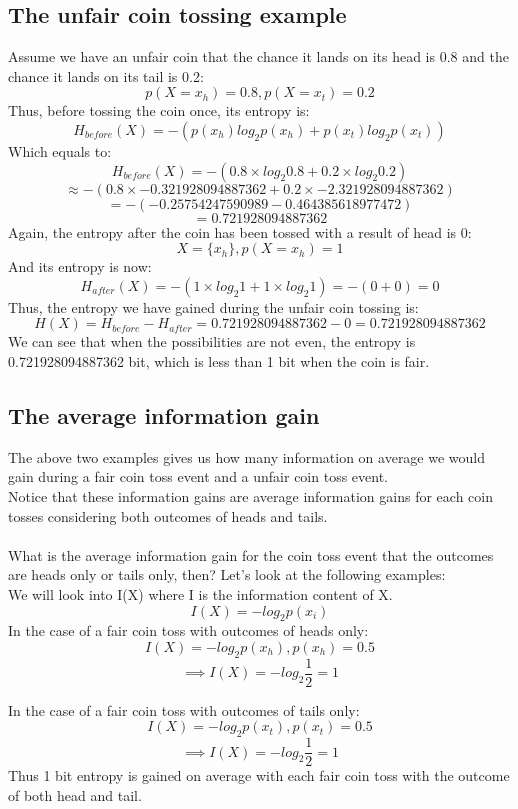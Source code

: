 \documentclass[12pt]{article}
\begin{document}
\subsection{The unfair coin tossing example}
Assume we have an unfair coin that the chance it lands on its head is 0.8 and the chance it lands on its tail is 0.2:
\[
	p(X=x_h) = 0.8, p(X=x_t) = 0.2
\]
Thus, before tossing the coin once, its entropy is:
\[
	H_{before}(X) = -(p(x_h)log_{2}p(x_h) + p(x_t)log_{2}p(x_t))
\]
Which equals to:
\[
	H_{before}(X) = -(0.8 \times log_{2} 0.8 + 0.2 \times log_{2} 0.2)
\]
\[
		\approx -(0.8 \times -0.321928094887362 + 0.2 \times -2.321928094887362)
\]
\[
		= -(-0.25754247590989-0.464385618977472)
\]
\[
		= 0.721928094887362
\]
Again, the entropy after the coin has been tossed with a result of head is 0:
\[
	X = \{x_h\} ,p(X=x_h) = 1
\]
And its entropy is now:
\[
	H_{after}(X) = - (1 \times log_2 1 + 1 \times log_2 1)
		= - (0 + 0) = 0
\]
Thus, the entropy we have gained during the unfair coin tossing is:
\[
	H(X) = H_{before} - H_{after} = 0.721928094887362 - 0 = 0.721928094887362
\]
We can see that when the possibilities are not even, the entropy is 0.721928094887362 bit, which is less than 1 bit when the coin is fair.\\

\subsection{The average information gain}
The above two examples gives us how many information on average we would gain during a fair coin toss event and a unfair coin toss event.\\
Notice that these information gains are average information gains for each coin tosses considering both outcomes of heads and tails.\\\\
What is the average information gain for the coin toss event that the outcomes are heads only or tails only, then? Let's look at the following examples:\\
We will look into I(X) where I is the information content of X.\\
\[
	I(X) = - log_2 p(x_i)
\]
In the case of a fair coin toss with outcomes of heads only:
\[
	I(X) = - log_2 p(x_h), p(x_h) = 0.5
\]
\[
\implies
	I(X) = - log_2 \frac{1}{2} = 1 
\]

In the case of a fair coin toss with outcomes of tails only:
\[
	I(X) = - log_2 p(x_t), p(x_t) = 0.5
\]
\[
\implies
	I(X) = - log_2 \frac{1}{2} = 1 
\]
Thus 1 bit entropy is gained on average with each fair coin toss with the outcome of both head and tail.\\
\end{document}
